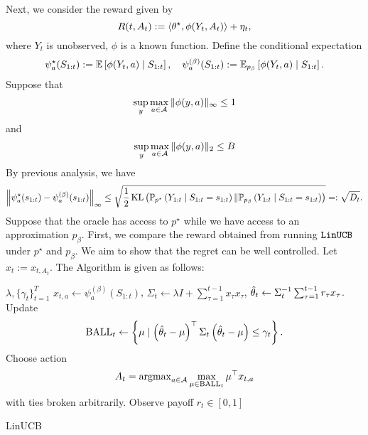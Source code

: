 \documentclass[letterpaper,11pt]{article}
\begin{document}
Next, we consider the reward given by
\begin{equation*}
    R(t, A_t) := \left\langle \theta^\star, \phi(Y_t, A_t) \right\rangle + \eta_t,
\end{equation*}
where $Y_t$ is unobserved, $\phi$ is a known function. 
Define the conditional expectation
\begin{equation*}
    \psi^\star_a(S_{1:t}) := \mathbb{E} \left[\phi(Y_t, a) \mid S_{1:t}\right], \quad \psi^{(\beta)}_a(S_{1:t}) := \mathbb{E}_{p_\beta} \left[\phi(Y_t, a) \mid S_{1:t}\right].
\end{equation*}
Suppose that 
$$
\sup_{y} \max_{a \in \mathcal{A}}\|\phi(y, a)\|_{\infty} \leq 1
$$
and 
$$
\sup_{y} \max_{a\in \mathcal{A}} \|\phi(y, a)\|_2 \leq B
$$
By previous analysis, we have 
\begin{equation*}
    \left\|\psi^\star_a(s_{1:t}) - \psi^{(\beta)}_a(s_{1:t})\right\|_{\infty} \leq \sqrt{\frac{1}{2} \operatorname{KL}\left(\mathbb{P}_{p^\star}\left(Y_{1:t} \mid S_{1:t} = s_{1:t}\right) \| \mathbb{P}_{p_\beta}\left(Y_{1:t} \mid S_{1:t} = s_{1:t}\right)\right)} =: \sqrt{D_t}. 
\end{equation*}
Suppose that the oracle has access to $p^\star$ while we have access to an approximation $p_\beta$. 
First, we compare the reward obtained from running $\texttt{LinUCB}$ under $p^\star$ and $p_\beta$. 
We aim to show that the regret can be well controlled.
Let $x_{t} := x_{t,A_t}$.
The Algorithm is given as follows:
\begin{algorithm}[H]
\begin{algorithmic}[1]
\REQUIRE $\lambda, \{\gamma_t\}_{t=1}^T$
\STATE $x_{t,a} \gets \psi_a^{(\beta)}(S_{1:t})$, $\Sigma_t \gets \lambda I + \sum_{\tau=1}^{t-1} x_\tau x_{\tau}$, $\hat{\theta}_t \gets \Sigma_t^{-1} \sum_{\tau=1}^{t-1} r_{\tau} x_{\tau}$. 
\STATE Update
$$
\operatorname{BALL}_t \gets \left\{ \mu \mid \left(\hat{\theta}_t - \mu\right)^\top \Sigma_t \left(\hat{\theta}_t - \mu\right) \leq \gamma_t\right\}. 
$$
\STATE Choose action 
$$
A_t=\operatorname{argmax}_{a \in \mathcal{A}} \max _{\mu \in \operatorname{BALL}_t} \mu^\top x_{t,a}
$$
with ties broken arbitrarily. 
\STATE Observe payoff $r_t \in [0, 1]$
\ENDFOR
\end{algorithmic}
\caption{LinUCB}
\label{alg:seq}
\end{algorithm}
\end{document}
